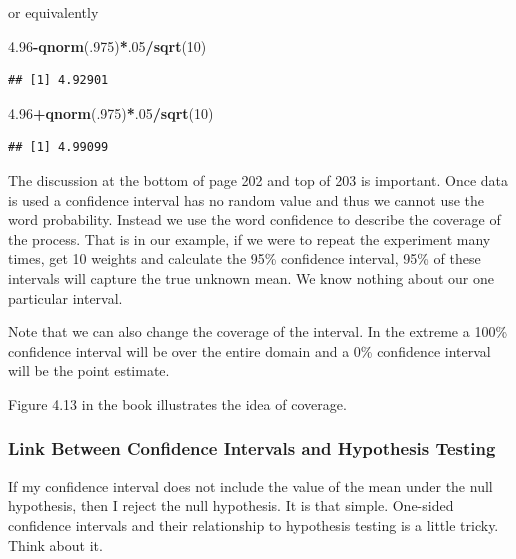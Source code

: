 \documentclass[]{book}
\newenvironment{Shaded}{\begin{snugshade}}{\end{snugshade}}
\newcommand{\KeywordTok}[1]{\textcolor[rgb]{0.13,0.29,0.53}{\textbf{#1}}}
\newcommand{\DecValTok}[1]{\textcolor[rgb]{0.00,0.00,0.81}{#1}}
\newcommand{\FloatTok}[1]{\textcolor[rgb]{0.00,0.00,0.81}{#1}}
\newcommand{\OperatorTok}[1]{\textcolor[rgb]{0.81,0.36,0.00}{\textbf{#1}}}
\newcommand{\NormalTok}[1]{#1}
\theoremstyle{definition}
\theoremstyle{definition}
\theoremstyle{definition}
\theoremstyle{remark}
\begin{document}
or equivalently

\begin{Shaded}
\begin{Highlighting}[]
\FloatTok{4.96}\OperatorTok{-}\KeywordTok{qnorm}\NormalTok{(.}\DecValTok{975}\NormalTok{)}\OperatorTok{*}\NormalTok{.}\DecValTok{05}\OperatorTok{/}\KeywordTok{sqrt}\NormalTok{(}\DecValTok{10}\NormalTok{)}
\end{Highlighting}
\end{Shaded}

\begin{verbatim}
## [1] 4.92901
\end{verbatim}

\begin{Shaded}
\begin{Highlighting}[]
\FloatTok{4.96}\OperatorTok{+}\KeywordTok{qnorm}\NormalTok{(.}\DecValTok{975}\NormalTok{)}\OperatorTok{*}\NormalTok{.}\DecValTok{05}\OperatorTok{/}\KeywordTok{sqrt}\NormalTok{(}\DecValTok{10}\NormalTok{)}
\end{Highlighting}
\end{Shaded}

\begin{verbatim}
## [1] 4.99099
\end{verbatim}

The discussion at the bottom of page 202 and top of 203 is important.
Once data is used a confidence interval has no random value and thus we
cannot use the word probability. Instead we use the word confidence to
describe the coverage of the process. That is in our example, if we were
to repeat the experiment many times, get 10 weights and calculate the
95\% confidence interval, 95\% of these intervals will capture the true
unknown mean. We know nothing about our one particular interval.

Note that we can also change the coverage of the interval. In the
extreme a 100\% confidence interval will be over the entire domain and a
0\% confidence interval will be the point estimate.

Figure 4.13 in the book illustrates the idea of coverage.

\subsubsection{Link Between Confidence Intervals and Hypothesis
Testing}\label{link-between-confidence-intervals-and-hypothesis-testing}

If my confidence interval does not include the value of the mean under
the null hypothesis, then I reject the null hypothesis. It is that
simple. One-sided confidence intervals and their relationship to
hypothesis testing is a little tricky. Think about it.
\end{document}
